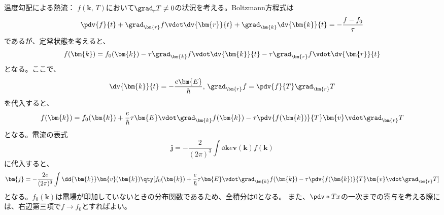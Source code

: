 温度勾配による熱流：
$f(\bm{k},\,T)$において$\grad_{r}T\neq 0$の状況を考える。Boltzmann方程式は
\begin{equation}
	\pdv{f}{t} + \grad_{\bm{r}}f\vdot\dv{\bm{r}}{t} + \grad_{\bm{k}}\dv{\bm{k}}{t} = -\frac{f-f_0}{\tau}
\end{equation}
であるが、定常状態を考えると、
\begin{equation}
	f(\bm{k}) = f_0(\bm{k}) - \tau\grad_{\bm{k}}f\vdot\dv{\bm{k}}{t} - \tau\grad_{\bm{r}}f\vdot\dv{\bm{r}}{t}
\end{equation}
となる。ここで、
\begin{equation}
	\dv{\bm{k}}{t} = -\frac{e\bm{E}}{\hbar},\,\grad_{\bm{r}}f = \pdv{f}{T}\grad_{\bm{r}}T
\end{equation}
を代入すると、
\begin{equation}
	f(\bm{k}) = f_0(\bm{k}) + \frac{e}{\hbar}\tau\bm{E}\vdot\grad_{\bm{k}}f(\bm{k}) - \tau\pdv{f(\bm{k})}{T}\bm{v}\vdot\grad_{\bm{r}}T
\end{equation}
となる。電流の表式
\begin{equation}
	\bm{j} = -\frac{2}{(2\pi)^3}\int\dd{\bm{k}}e\bm{v}(\bm{k})f(\bm{k})
\end{equation}
に代入すると、
\begin{equation}
	\bm{j} = -\frac{2e}{(2\pi)^3}\int\dd{\bm{k}}\bm{v}(\bm{k})\qty[f_0(\bm{k}) + \frac{e}{\hbar}\tau\bm{E}\vdot\grad_{\bm{k}}f(\bm{k}) - \tau\pdv{f(\bm{k})}{T}\bm{v}\vdot\grad_{\bm{r}}T]
\end{equation}
となる。$f_0(\bm{k})$は電場が印加していないときの分布関数であるため、全積分は$0$となる。
また、$\pdv*{T}{x}$の一次までの寄与を考える際には、右辺第三項で$f\to{}f_0$とすればよい。


